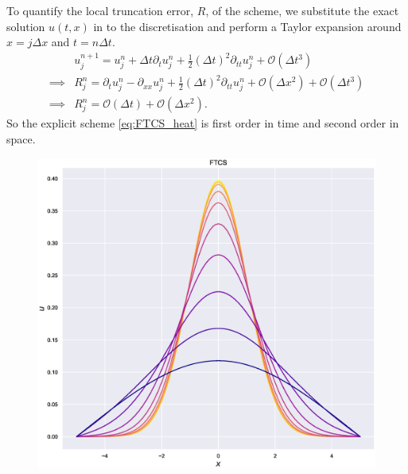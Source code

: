 \documentclass[11pt, a4paper, draft]{article}
\newcommand{\Dt}{\Delta t}
\newcommand{\Dx}{\Delta x}
\begin{document}
        
        To quantify the local truncation error, $R$, of the scheme, we substitute the exact solution $u(t,x)$ in to the discretisation and perform a Taylor expansion around $x=j\Dx$ and $t = n\Dt$.  
        \begin{align*}
            &u^{n+1}_j = u^n_j + \Dt \partial_t u^n_j + \frac{1}{2}(\Dt)^2 \partial_{tt} u^n_j + \mathcal{O}(\Dt^3)\\
            \implies& R^n_j = \partial_t u^n_j - \partial_{xx}u^n_j + \frac{1}{2}(\Dt)^2 \partial_{tt} u^n_j +  \mathcal{O}(\Dx^2)+\mathcal{O}(\Dt^3)\\
            \implies& R^n_j = \mathcal{O}(\Dt)+\mathcal{O}(\Dx^2).
        \end{align*}
        So the explicit scheme \eqref{eq:FTCS_heat} is first order in time and second order in space. 
        \begin{figure}
            \centering
            \begin{minipage}[b]{0.49\textwidth}
                \centering
                \includegraphics[width=\textwidth]{Figures/stableFTCSheat.eps}
            \end{minipage} %
            \begin{minipage}[b]{0.49\textwidth}
                \centering

\end{minipage}
\end{figure}
\end{document}
